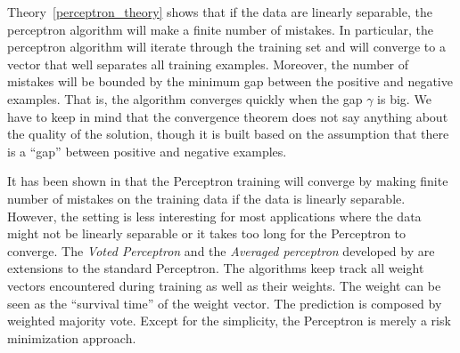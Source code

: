 {Theory~\ref{perceptron_theory} shows that if the data are linearly separable, the perceptron algorithm will make a finite number of mistakes. 
In particular, the perceptron algorithm will iterate through the training set and will converge to a vector that well separates all training examples.
Moreover, the number of mistakes will be bounded by the minimum gap between the positive and negative examples.
That is, the algorithm converges quickly when the gap $\gamma$ is big.
We have to keep in mind that the convergence theorem does not say anything about the quality of the solution, though it is built based on the assumption that there is a ``gap'' between positive and negative examples.
\fi

It has been shown in \citep{Block62the,Novikoff62} that the Perceptron training will converge by making finite number of mistakes on the training data if the data is linearly separable.
However, the setting is less interesting for most applications where the data might not be linearly separable or it takes too long for the Perceptron to converge.
The \textit{Voted Perceptron} and the \textit{Averaged perceptron} developed by \citet{Freund99large} are extensions to the standard Perceptron.
The algorithms keep track all weight vectors encountered during training as well as their weights.
The weight can be seen as the ``survival time'' of the weight vector.
The prediction is composed by weighted majority vote.
Except for the simplicity, the Perceptron is merely a risk minimization approach.

}
